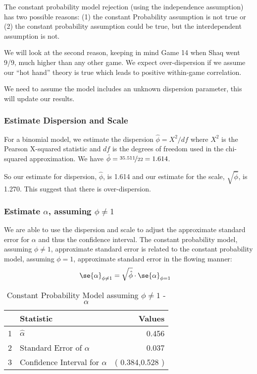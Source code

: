 \documentclass[12pt, letterpaper]{article}
\begin{document}
The constant probability model rejection (using the independence assumption) has two possible reasons: (1) the constant Probability assumption is not true or (2) the constant probability assumption could be true, but the interdependent assumption is not. 

We will look at the second reason, keeping in mind Game 14 when Shaq went 9/9, much higher than any other game.  We expect over-dispersion if we assume our ``hot hand'' theory is true which leads to positive within-game correlation.  

We need to assume the model includes an unknown dispersion parameter, this will update our results.    

\subsubsection{Estimate Dispersion and Scale} 
For a binomial model, we estimate the dispersion $\hat{\phi} = X^2 / df$ where $X^2$ is the Pearson X-squared statistic  and $df$ is the degrees of freedom used in the chi-squared approximation.  We have $\hat{\phi} = \nicefrac{35.511}{22} = 1.614$.  

So our estimate for dispersion, $\hat{\phi}$, is 1.614 and our estimate for the scale, $\sqrt{ \hat{\phi}}$, is 1.270.  This suggest that there is over-dispersion.  


\subsubsection{Estimate $\alpha$, assuming $\phi \neq 1$} 

We are able to use the dispersion and scale to adjust the approximate standard error for $\alpha$ and thus the confidence interval.  The constant probability model, assuming $\phi \neq 1$,  approximate standard error is related to the constant probability model, assuming $\phi =1$, approximate standard error in the flowing manner:  
\begin{align*}
\se{\alpha}_{\phi \neq 1}  & = \sqrt{\hat{\phi}} \cdot \se{\alpha}_{\phi = 1} 
\end{align*}


\begin{table}[ht]
	\centering
	\caption{Constant Probability Model assuming $\phi \neq 1$ - $\alpha$} 
	\begin{tabular}{llr}
		\hline
		& Statistic & Values \\ 
		\hline
		1 & $\hat{\alpha}$ & 0.456 \\ 
		2 & Standard Error of $\alpha$ & 0.037 \\ 
		3 & Confidence Interval for $\alpha$ & ( 0.384,0.528 ) \\ 
		\hline
	\end{tabular}
\end{table}
\end{document}
